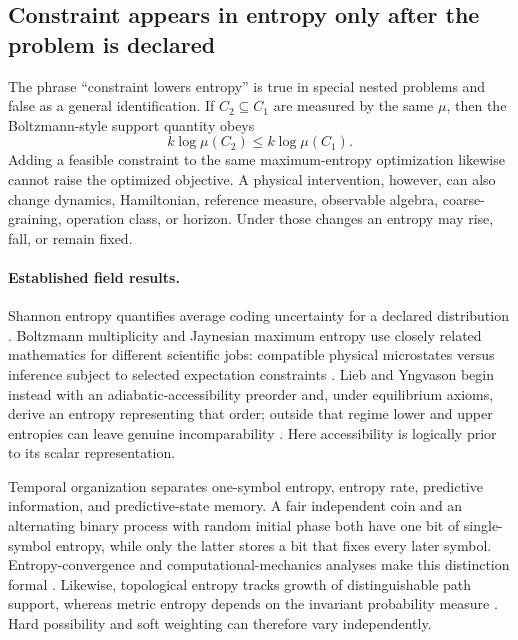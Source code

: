 \subsection{Constraint appears in entropy only after the problem is declared}

The phrase ``constraint lowers entropy'' is true in special nested problems and
false as a general identification.  If $C_2\subseteq C_1$ are measured by the
same $\mu$, then the Boltzmann-style support quantity obeys
\begin{equation}
 k\log\mu(C_2)\leq k\log\mu(C_1).
 \label{eq:nested-support}
\end{equation}
Adding a feasible constraint to the same maximum-entropy optimization likewise
cannot raise the optimized objective.  A physical intervention, however, can
also change dynamics, Hamiltonian, reference measure, observable algebra,
coarse-graining, operation class, or horizon.  Under those changes an entropy
may rise, fall, or remain fixed.

\paragraph{Established field results.}
Shannon entropy quantifies average coding uncertainty for a declared
distribution \citep{Shannon1948Communication}.  Boltzmann multiplicity and
Jaynesian maximum entropy use closely related mathematics for different
scientific jobs: compatible physical microstates versus inference subject to
selected expectation constraints \citep{Boltzmann1877Relationship,
Jaynes1957InformationTheory}.  Lieb and Yngvason begin instead with an
adiabatic-accessibility preorder and, under equilibrium axioms, derive an
entropy representing that order; outside that regime lower and upper entropies
can leave genuine incomparability \citep{LiebYngvason1999SecondLaw,
LiebYngvason2013Nonequilibrium}.  Here accessibility is logically prior to its
scalar representation.

Temporal organization separates one-symbol entropy, entropy rate, predictive
information, and predictive-state memory.  A fair independent coin and an
alternating binary process with random initial phase both have one bit of
single-symbol entropy, while only the latter stores a bit that fixes every
later symbol.  Entropy-convergence and computational-mechanics analyses make
this distinction formal \citep{CrutchfieldFeldman2003Regularities,
ShaliziCrutchfield2001ComputationalMechanics}.  Likewise, topological entropy
tracks growth of distinguishable path support, whereas metric entropy depends
on the invariant probability measure \citep{Kolmogorov1958MetricInvariant,
Sinai1959Entropy,AdlerEtAl1965TopologicalEntropy}.  Hard possibility and soft
weighting can therefore vary independently.

